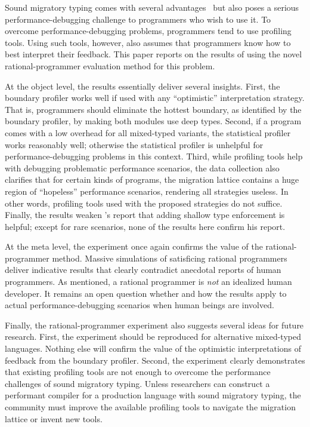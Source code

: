

Sound migratory typing comes with several advantages~\cite{lgfd-icfp-2021,
lgfd-icfp-2023} but also poses a serious performance-debugging challenge to
programmers who wish to use it. To overcome performance-debugging problems,
programmers tend to use profiling tools. Using such tools, however, also assumes
that programmers know how to best interpret their feedback. This paper reports
on the results of using the novel rational-programmer evaluation method for this
problem.

At the object level, the results essentially deliver several insights. First,
the boundary profiler works well if used with any ``optimistic''
interpretation strategy. That is, programmers should eliminate the hottest
boundary, as identified by the boundary profiler, by making both modules
use deep types. Second, if a program comes with a low overhead for all
mixed-typed variants, the statistical profiler works reasonably well;
otherwise the statistical profiler is unhelpful for performance-debugging
problems in this context. Third, while profiling tools help with debugging
problematic performance scenarios, the data collection also clarifies that for
certain kinds of programs, the migration lattice contains a huge region
of ``hopeless'' performance scenarios, rendering all strategies
useless. In other words, profiling tools used with the proposed strategies do
not suffice. Finally, the results weaken \citet{g-deep-shallow}'s report that
adding shallow type enforcement is helpful; except for rare scenarios, none of
the results here confirm his report.

At the meta level, the experiment once again confirms the value of the
rational-programmer method. Massive simulations of satisficing rational
programmers deliver indicative results that clearly contradict anecdotal reports
of human programmers. As mentioned, a rational programmer is {\em not\/} an
idealized human developer. It remains an open question whether and how the
results apply to actual performance-debugging scenarios when human beings are
involved.

Finally, the rational-programmer experiment also suggests several ideas for
future research. First, the experiment should be reproduced for alternative
mixed-typed languages. Nothing else will confirm the value of the optimistic
interpretations of feedback from the boundary profiler. Second, the
experiment clearly demonstrates that existing profiling tools are not enough to
overcome the performance challenges of sound migratory typing. Unless researchers
can construct a performant compiler for a production language with sound migratory 
typing, the community must improve the available profiling tools to navigate the
migration lattice or invent new tools.



